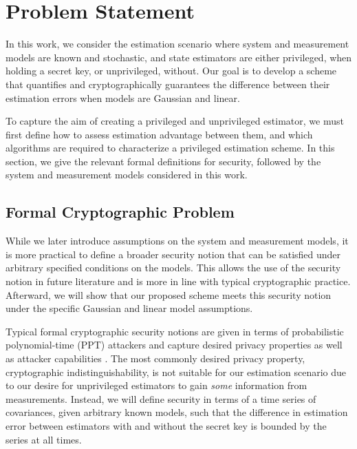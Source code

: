 \documentclass[letterpaper, 10 pt, conference]{ieeeconf}
\begin{document}
\section{Problem Statement}\label{sec:problem_statement}
In this work, we consider the estimation scenario where system and measurement models are known and stochastic, and state estimators are either privileged, when holding a secret key, or unprivileged, without. Our goal is to develop a scheme that quantifies and cryptographically guarantees the difference between their estimation errors when models are Gaussian and linear.

To capture the aim of creating a privileged and unprivileged estimator, we must first define how to assess estimation advantage between them, and which algorithms are required to characterize a privileged estimation scheme. In this section, we give the relevant formal definitions for security, followed by the system and measurement models considered in this work.

% 
% 

\subsection{Formal Cryptographic Problem}\label{subsec:crypto_problem}
While we later introduce assumptions on the system and measurement models, it is more practical to define a broader security notion that can be satisfied under arbitrary specified conditions on the models. This allows the use of the security notion in future literature and is more in line with typical cryptographic practice. Afterward, we will show that our proposed scheme meets this security notion under the specific Gaussian and linear model assumptions.

Typical formal cryptographic security notions are given in terms of probabilistic polynomial-time (PPT) attackers and capture desired privacy properties as well as attacker capabilities \cite[Ch. 3]{katzIntroductionModernCryptography2008}. The most commonly desired privacy property, cryptographic indistinguishability, is not suitable for our estimation scenario due to our desire for unprivileged estimators to gain \textit{some} information from measurements. Instead, we will define security in terms of a time series of covariances, given arbitrary known models, such that the difference in estimation error between estimators with and without the secret key is bounded by the series at all times.
\end{document}
